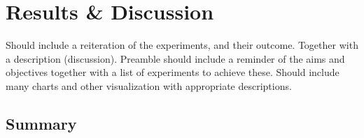 \chapter{Results \& Discussion}
Should include a reiteration of the experiments, and their outcome.  Together with a description (discussion).  Preamble should include a reminder of the aims and objectives together with a list of experiments to achieve these.  Should include many charts and other visualization with appropriate descriptions.  

\Blindtext

\section{Summary}
\blindtext\enlargethispage{\baselineskip} %